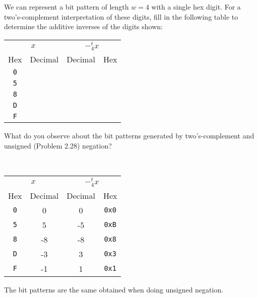 \documentclass[12pt]{article}
\newenvironment{ex}[2][Exercise]{\begin{trivlist}
		\item[\hskip \labelsep {\bfseries #1}\hskip \labelsep {\bfseries #2.}]}{\end{trivlist}}
\newenvironment{sol}[1][Solution]{\begin{trivlist}
		\item[\hskip \labelsep {\bfseries #1:}]}{\end{trivlist}}
\begin{document}
\begin{ex}{2.33}
	We can represent a bit pattern of length $w=4$ with a single hex digit. For a
	two's-complement interpretation of these digits, fill in the following table to
	determine the additive inverses of the digits shown:
	\begin{center}
		\begin{tabular}{cccc}
			\multicolumn{2}{c}{$x$} & \multicolumn{2}{c}{$-^t_4x$}\\
			Hex & Decimal & Decimal & Hex\\
			\hline
			\texttt{0} &  \makebox[1cm]{\hrulefill}  &  \makebox[1cm]{\hrulefill} &  \makebox[1cm]{\hrulefill} \\
			\texttt{5} &  \makebox[1cm]{\hrulefill}  &  \makebox[1cm]{\hrulefill}  &  \makebox[1cm]{\hrulefill} \\
			\texttt{8} &  \makebox[1cm]{\hrulefill}  &  \makebox[1cm]{\hrulefill}  &  \makebox[1cm]{\hrulefill} \\
			\texttt{D} &  \makebox[1cm]{\hrulefill}  &  \makebox[1cm]{\hrulefill}  &  \makebox[1cm]{\hrulefill} \\
			\texttt{F} &  \makebox[1cm]{\hrulefill}  &  \makebox[1cm]{\hrulefill}  &  \makebox[1cm]{\hrulefill} 
		\end{tabular}
	\end{center}
	What do you observe about the bit patterns generated by two's-complement
	and unsigned (Problem 2.28) negation?
\end{ex}

\begin{sol}
	\
	\begin{center}
		\begin{tabular}{cccc}
			\multicolumn{2}{c}{$x$} & \multicolumn{2}{c}{$-^t_4x$}\\
			Hex & Decimal & Decimal & Hex\\
			\hline
			\texttt{0} &  0  &  0 & \texttt{0x0}\\
			\texttt{5} &  5 & -5 & \texttt{0xB} \\
			\texttt{8} & -8 & -8 & \texttt{0x8}\\
			\texttt{D} & -3 & 3 & \texttt{0x3} \\
			\texttt{F} & -1 & 1 & \texttt{0x1}
		\end{tabular}
	\end{center}
	The bit patterns are the same obtained when doing unsigned negation.
\end{sol}
\end{document}
